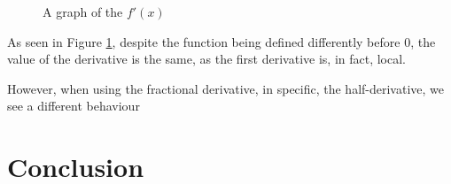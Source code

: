 \documentclass{article}
\begin{document}
\begin{figure}[H]
\def\figmax{10}
\centering
{}
\caption{A graph of the $f'(x)$} \label{firstderivative}
\end{figure}

As seen in Figure \ref{firstderivative}, despite the function being defined
differently before $0$, the value of the derivative is the same, as the first
derivative is, in fact, local.

However, when using the fractional derivative, in specific, the
half-derivative, we see a different behaviour

\section{Conclusion}

\pagebreak

\printbibliography
\end{document}

